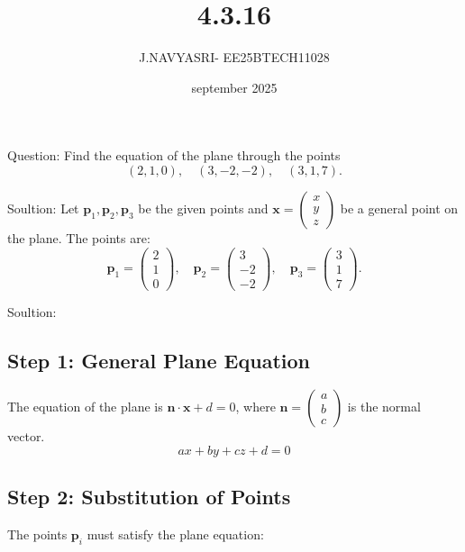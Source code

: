 \documentclass{beamer}
\title %
{4.3.16}
\date{september 2025}
\author %
{J.NAVYASRI- EE25BTECH11028}
\begin{document}
\frame{\titlepage}
\begin{frame}{Question:}
Find the equation of the plane through the points  
\[
(2,1,0), \quad (3,-2,-2), \quad (3,1,7).
\]
\end{frame}

\begin{frame}{Soultion:}
Let $\mathbf{p}_1, \mathbf{p}_2, \mathbf{p}_3$ be the given points and $\mathbf{x} = \begin{pmatrix} x\\y\\z \end{pmatrix}$ be a general point on the plane. The points are:
\[
\mathbf{p}_1 = \begin{pmatrix} 2\\1\\0 \end{pmatrix}, \quad
\mathbf{p}_2 = \begin{pmatrix} 3\\-2\\-2 \end{pmatrix}, \quad %
\mathbf{p}_3 = \begin{pmatrix} 3\\1\\7 \end{pmatrix}.
\]
\end{frame}

\begin{frame}{Soultion:}
\subsection*{Step 1: General Plane Equation}
The equation of the plane is $\mathbf{n} \cdot \mathbf{x} + d = 0$, where $\mathbf{n} = \begin{pmatrix} a\\b\\c \end{pmatrix}$ is the normal vector.
\[
ax + by + cz + d = 0 \tag{1}
\]
\subsection*{Step 2: Substitution of Points}
The points $\mathbf{p}_i$ must satisfy the plane equation:
\end{frame}
\end{document}

